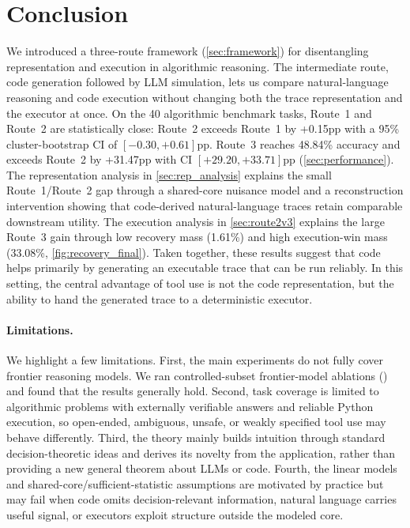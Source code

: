 \section{Conclusion}
\label{sec:conclusion}
We introduced a three-route framework (\cref{sec:framework}) for disentangling representation and execution in algorithmic reasoning. The intermediate route, code generation followed by LLM simulation, lets us compare natural-language reasoning and code execution without changing both the trace representation and the executor at once. On the 40 algorithmic benchmark tasks, Route~1 and Route~2 are statistically close: Route~2 exceeds Route~1 by +0.15pp with a 95\% cluster-bootstrap CI of $[-0.30,+0.61]$pp. Route~3 reaches 48.84\% accuracy and exceeds Route~2 by +31.47pp with CI $[+29.20,+33.71]$pp (\cref{sec:performance}). The representation analysis in \cref{sec:rep_analysis} explains the small Route~1/Route~2 gap through a shared-core nuisance model and a reconstruction intervention showing that code-derived natural-language traces retain comparable downstream utility. The execution analysis in \cref{sec:route2v3} explains the large Route~3 gain through low recovery mass (1.61\%) and high execution-win mass (33.08\%, \cref{fig:recovery_final}). Taken together, these results suggest that code helps primarily by generating an executable trace that can be run reliably. In this setting, the central advantage of tool use is not the code representation, but the ability to hand the generated trace to a deterministic executor.



\paragraph{Limitations.}
We highlight a few limitations. First, the main experiments do not fully cover frontier reasoning models. We ran controlled-subset frontier-model ablations () and found that the results generally hold. Second, task coverage is limited to algorithmic problems with externally verifiable answers and reliable Python execution, so open-ended, ambiguous, unsafe, or weakly specified tool use may behave differently. Third, the theory mainly builds intuition through standard decision-theoretic ideas and derives its novelty from the application, rather than providing a new general theorem about LLMs or code. Fourth, the linear models and shared-core/sufficient-statistic assumptions are motivated by practice but may fail when code omits decision-relevant information, natural language carries useful signal, or executors exploit structure outside the modeled core.


